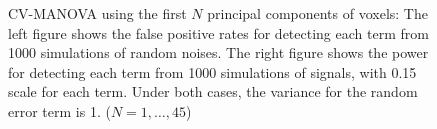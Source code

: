 \documentclass[english]{article}\usepackage[]{graphicx}\usepackage[]{color}
\begin{document}
\begin{figure}[H]
\centering{}\protect\caption{{\footnotesize{}CV-MANOVA using the first $N$ principal components
of voxels: The left figure shows the false positive rates for detecting
each term from 1000 simulations of random noises. The right figure
shows the power for detecting each term from 1000 simulations of signals,
with 0.15 scale for each term. Under both cases, the variance for
the random error term is 1. ($N=1,\ldots,45$) }{\small{}\label{fig:CV-MANOVA-PCA}}}
\end{figure}
\end{document}
